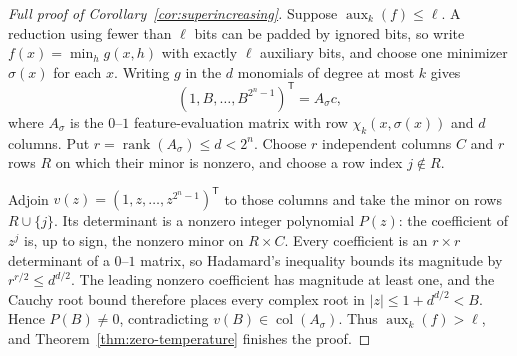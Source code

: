 \documentclass{article}
\begin{document}
\begin{proof}[Full proof of Corollary~\ref{cor:superincreasing}]
Suppose $\operatorname{aux}_k(f)\le\ell$.  A reduction using fewer than
$\ell$ bits can be padded by ignored bits, so write
$f(x)=\min_h g(x,h)$ with exactly $\ell$ auxiliary bits, and choose one
minimizer $\sigma(x)$ for each $x$.  Writing $g$ in the $d$ monomials of degree
at most $k$ gives
\[
  (1,B,\ldots,B^{2^n-1})^\mathsf T=A_\sigma c,
\]
where $A_\sigma$ is the $0$--$1$ feature-evaluation matrix with row
$\chi_k(x,\sigma(x))$ and $d$ columns.  Put
$r=\operatorname{rank}(A_\sigma)\le d<2^n$.
Choose $r$ independent columns $C$ and $r$ rows $R$ on which their minor is
nonzero, and choose a row index $j\notin R$.

Adjoin $v(z)=(1,z,\ldots,z^{2^n-1})^\mathsf T$ to those columns and take the
minor on rows $R\cup\{j\}$.  Its determinant is a nonzero integer polynomial
$P(z)$: the coefficient of $z^j$ is, up to sign, the nonzero minor on
$R\times C$.  Every coefficient is an $r\times r$ determinant of a $0$--$1$
matrix, so Hadamard's inequality bounds its magnitude by
$r^{r/2}\le d^{d/2}$.  The leading nonzero coefficient has magnitude at least
one, and the Cauchy root bound therefore places every complex root in
$|z|\le1+d^{d/2}<B$.  Hence $P(B)\ne0$, contradicting
$v(B)\in\operatorname{col}(A_\sigma)$.  Thus
$\operatorname{aux}_k(f)>\ell$, and
Theorem~\ref{thm:zero-temperature} finishes the proof.
\end{proof}

\medskip
\printbibliography
\end{document}
